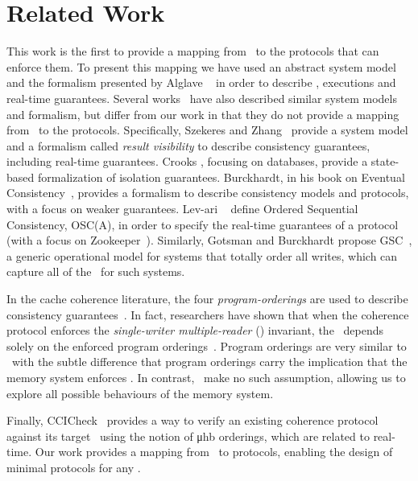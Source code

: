 \section{Related Work} \label{sec:related}



This work is the first to provide a mapping from \mcms\ to the protocols that can enforce them. To present this mapping we have used an abstract system model and the formalism presented by Alglave \etal~\cite{Alglave:2014} in order to describe \mcms, executions and real-time guarantees. Several works~\cite{Szekeres:2018,Crooks:2017, Burckhardt:2014, LevAri:2017, Gotsman:2017} have also described similar system models and formalism, but differ from our work in that they do not provide a mapping from \mcms\ to the protocols.
Specifically, Szekeres and Zhang~\cite{Szekeres:2018} provide a system model and a formalism called \emph{result visibility} to describe consistency guarantees, including real-time guarantees.
Crooks \etal\cite{Crooks:2017}, focusing on databases, provide a state-based formalization of isolation guarantees.
Burckhardt, in his book on Eventual Consistency~\cite{Burckhardt:2014}, provides a formalism to describe consistency models and protocols, with a focus on weaker guarantees.
Lev-ari \etal~\cite{LevAri:2017} define Ordered Sequential Consistency, OSC(A), in order to specify the real-time guarantees of a protocol (with a focus on Zoo\-kee\-per~\cite{Hunt:2010}). 
Similarly, Gotsman  and  Burckhardt propose GSC~\cite{Gotsman:2017}, a generic operational model for systems that totally order all writes, which can capture all of the \srts\ for such systems.


\custvspace
In the cache coherence literature, the four \emph{program-orderings} are used to describe consistency guarantees~\cite{Vijay:2020}. In fact, 
researchers have shown that when the coherence protocol enforces the \emph{single-writer multiple-reader} (\SWMR) invariant, the \mcm\ depends solely on the enforced program orderings~\cite{Arvind:2006, Meixner:2005}.
Program orderings are very similar to \prts\ with the subtle difference that program orderings carry the implication that the memory system enforces \SWMR. In contrast, \prts\ make no such assumption, allowing us to explore all possible behaviours of the memory system.

Finally, CCICheck~\cite{Manerkar:2015} provides a way to verify an existing coherence protocol against its target \mcm\ using the notion of μhb orderings, which are related to real-time.
Our work provides a mapping from \mcms\ to protocols, enabling the design of minimal protocols for any \mcm.























